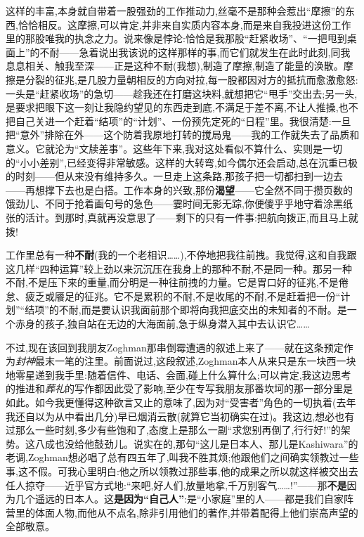 这样的丰富,本身就自带着一股强劲的工作推动力,丝毫不是那种会惹出“摩擦”的东西,恰恰相反。这摩擦,可以肯定,并非来自实质内容本身,而是来自我投进这份工作里的那股唯我的执念之力。说来像是悖论:恰恰是我那股“赶紧收场”、“一把甩到桌面上”的不耐——急着说出我该说的这样那样的事,而它们就发生在此时此刻,同我息息相关、触我至深——正是这种不耐(我想),制造了摩擦,制造了能量的涣散。摩擦是分裂的征兆,是几股力量朝相反的方向对拉,每一股都因对方的抵抗而愈激愈怒:
一头是“赶紧收场”的急切——趁我还在打磨这块料,就想把它“甩手”交出去;另一头,是要求把眼下这一刻让我隐约望见的东西走到底,不满足于差不离,不让人推搡,也不把自己关进一个赶着“结项”的“计划”、一份预先定死的“日程”里。我很清楚:一旦把“意外”排除在外——这个防着我原地打转的搅局鬼——我的工作就失去了品质和意义。它\dmark{}就沦为“文牍差事”。这些年下来,我对这处看似不算什么、实则是一切的“小小差别”,已经变得非常敏感。这样的大转弯,如今偶尔还会启动,总在沉重已极的时刻——但从来没有维持多久。一旦走上这条路,那孩子把一切都扫到一边去——再想撑下去也是白搭。工作本身的兴致,那份\textbf{渴望}——它全然不同于攒页数的饿劲儿、不同于抢着画句号的急色——霎时间无影无踪,你便傻乎乎地守着涂黑纸张的活计。到那时,真就再没意思了——剩下的只有一件事:把航向拨正,而且马上就拨!

工作里总有一种\textbf{不耐}(我的一个老相识……),不停地把我往前拽。我觉得,这和自我跟这几样“四种运算”较上劲以来沉沉压在我身上的那种不耐,不是同一种。那另一种不耐,不是压下来的重量,而分明是一种往前拽的力量。它是胃口好的征兆,不是倦怠、疲乏或餍足的征兆。它不是累积的不耐,不是收尾的不耐,不是赶着把一份“计划”“结项”的不耐,而是要认识我面前那个即将向我把底交出的未知者的不耐。是一个赤身的孩子,独自站在无边的大海面前,急于纵身潜入其中去认识它……

不过,现在该回到我朋友Zoghman那串倒霉遭遇的叙述上来了——就在这条预定作为\emph{封神}最末一笔的注里。前面说过,这段叙述,Zoghman本人从来只是东一块西一块地零星递到我手里:随着信件、电话、会面,碰上什么算什么;可以肯定,我这边思考的推进和\emph{葬礼}的写作都因此受了影响,至少在专写我朋友那番坎坷的那一部分里是如此。如今我更懂得这种欲言又止的意味了,因为对“受害者”角色的一切执着(去年我还自以为从中看出几分)早已烟消云散(就算它当初确实在过)。我这边,想必也有过那么一些时刻,多少有些饱和了,态度上是那么一副“求您别再倒了,行行好!”的架势。这八成也没给他鼓劲儿。说实在的,那句“这儿是日本人、那儿是Kashiwara”的老调,Zoghman想必唱了总有四五年了,叫我不胜其烦;他跟他们之间确实领教过一些事,这不假。可我心里明白:他之所以领教过那些事,他的成果之所以就这样被交出去任人掠夺——近乎官方式地:“来吧,好人们,放量地拿,千万别客气……!”——那\textbf{不是}因为几个遥远\dmark{}的日本人。这\textbf{是因为“自己人”}:是“小家庭”里的人——都是我们自家阵营里的体面人物,而他从不点名,除非引用他们的著作,并带着配得上他们崇高声望的全部敬意。

